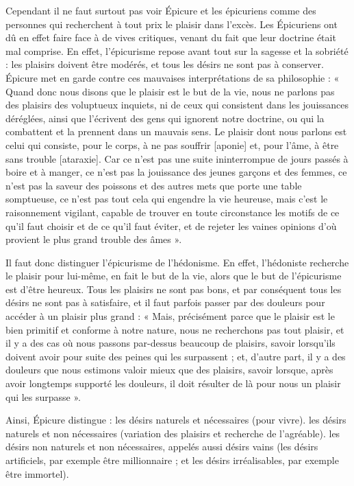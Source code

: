 \documentclass[french]{book}
\theoremstyle{definition}
\begin{document}
Cependant il ne faut surtout pas voir Épicure et les épicuriens comme des personnes qui recherchent à tout prix le plaisir dans l’excès. Les Épicuriens ont dû en effet faire face à de vives critiques, venant du fait que leur doctrine était mal comprise. En effet, l’épicurisme repose avant tout sur la sagesse et la sobriété : les plaisirs doivent être modérés, et tous les désirs ne sont pas à conserver. Épicure met en garde contre ces mauvaises interprétations de sa philosophie : « Quand donc nous disons que le plaisir est le but de la vie, nous ne parlons pas des plaisirs des voluptueux inquiets, ni de ceux qui consistent dans les jouissances déréglées, ainsi que l’écrivent des gens qui ignorent notre doctrine, ou qui la combattent et la prennent dans un mauvais sens. Le plaisir dont nous parlons est celui qui consiste, pour le corps, à ne pas souffrir [aponie] et, pour l’âme, à être sans trouble [ataraxie]. Car ce n’est pas une suite ininterrompue de jours passés à boire et à manger, ce n’est pas la jouissance des jeunes garçons et des femmes, ce n’est pas la saveur des poissons et des autres mets que porte une table somptueuse, ce n’est pas tout cela qui engendre la vie heureuse, mais c’est le raisonnement vigilant, capable de trouver en toute circonstance les motifs de ce qu’il faut choisir et de ce qu’il faut éviter, et de rejeter les vaines opinions d’où provient le plus grand trouble des âmes ».

Il faut donc distinguer l’épicurisme de l’hédonisme. En effet, l’hédoniste recherche le plaisir pour lui-même, en fait le but de la vie, alors que le but de l’épicurisme est d’être heureux. Tous les plaisirs ne sont pas bons, et par conséquent tous les désirs ne sont pas à satisfaire, et il faut parfois passer par des douleurs pour accéder à un plaisir plus grand : « Mais, précisément parce que le plaisir est le bien primitif et conforme à notre nature, nous ne recherchons pas tout plaisir, et il y a des cas où nous passons par-dessus beaucoup de plaisirs, savoir lorsqu’ils doivent avoir pour suite des peines qui les surpassent ; et, d’autre part, il y a des douleurs que nous estimons valoir mieux que des plaisirs, savoir lorsque, après avoir longtemps supporté les douleurs, il doit résulter de là pour nous un plaisir qui les surpasse ».

Ainsi, Épicure distingue :
les désirs naturels et nécessaires (pour vivre).
les désirs naturels et non nécessaires (variation des plaisirs et recherche de l’agréable).
les désirs non naturels et non nécessaires, appelés aussi désirs vains (les désirs artificiels, par exemple être millionnaire ; et les désirs irréalisables, par exemple être immortel).
\end{document}
